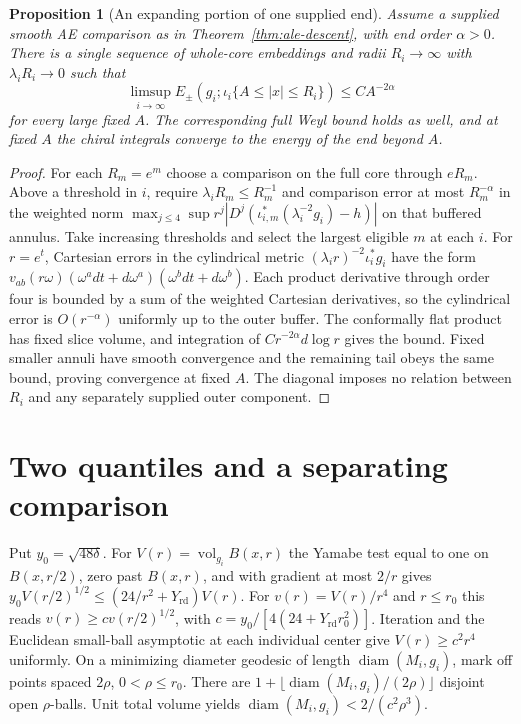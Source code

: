 \documentclass[11pt]{article}
\numberwithin{equation}{section}
\newtheorem{proposition}[theorem]{Proposition}
\theoremstyle{definition}
\theoremstyle{remark}
\newcommand{\vol}{\operatorname{vol}}
\newcommand{\Yrd}{Y_{\mathrm{rd}}}
\begin{document}
\begin{proposition}[An expanding portion of one supplied end]
Assume a supplied smooth AE comparison as in
Theorem~\ref{thm:ale-descent}, with end order \(\alpha>0\).
There is a single sequence of whole-core embeddings and
radii \(R_i\to\infty\) with \(\lambda_i R_i\to0\) such that
\[
 \limsup_{i\to\infty}
 E_\pm(g_i;\iota_i\{A\le |x|\le R_i\})
 \le C A^{-2\alpha}
\]
for every large fixed \(A\). The corresponding full Weyl
bound holds as well, and at fixed \(A\) the chiral integrals
converge to the energy of the end beyond \(A\).
\end{proposition}
\begin{proof}
For each \(R_m=e^m\) choose a comparison on the full core
through \(eR_m\). Above a threshold in \(i\), require
\(\lambda_i R_m\le R_m^{-1}\) and comparison error at most
\(R_m^{-\alpha}\) in the weighted norm
\(\max_{j\le4}\sup r^j|D^j(\iota_{i,m}^*(\lambda_i^{-2}g_i)-h)|\)
on that buffered annulus. Take increasing thresholds and
select the largest eligible \(m\) at each \(i\).
For \(r=e^t\), Cartesian errors in the cylindrical metric
\((\lambda_i r)^{-2}\iota_i^*g_i\) have the form
\(v_{ab}(r\omega)(\omega^a dt+d\omega^a)
(\omega^b dt+d\omega^b)\). Each product derivative through
order four is bounded by a sum of the weighted Cartesian
derivatives, so the cylindrical error is \(O(r^{-\alpha})\)
uniformly up to the outer buffer. The conformally flat product
has fixed slice volume, and integration of
\(C r^{-2\alpha}d\log r\) gives the bound. Fixed smaller
annuli have smooth convergence and the remaining tail obeys
the same bound, proving convergence at fixed \(A\).
The diagonal imposes no relation between \(R_i\) and any
separately supplied outer component.
\end{proof}

\section{Two quantiles and a separating comparison}\label{sec:quantiles}

Put \(y_0=\sqrt{48\delta}\).
For \(V(r)=\vol_{g_i}B(x,r)\) the Yamabe test equal to one
on \(B(x,r/2)\), zero past \(B(x,r)\), and with gradient at
most \(2/r\) gives \(y_0 V(r/2)^{1/2}\le (24/r^2+\Yrd)V(r)\).
For \(v(r)=V(r)/r^4\) and \(r\le r_0\) this reads
\(v(r)\ge c v(r/2)^{1/2}\), with
\(c=y_0/[4(24+\Yrd r_0^2)]\). Iteration and the Euclidean
small-ball asymptotic at each individual center give
\(V(r)\ge c^2 r^4\) uniformly. On a minimizing diameter
geodesic of length \(\operatorname{diam}(M_i,g_i)\), mark off points
spaced \(2\rho\), \(0<\rho\le r_0\). There are
\(1+\lfloor\operatorname{diam}(M_i,g_i)/(2\rho)\rfloor\)
disjoint open \(\rho\)-balls. Unit total volume yields
\(\operatorname{diam}(M_i,g_i)<2/(c^2\rho^3)\).
\end{document}
